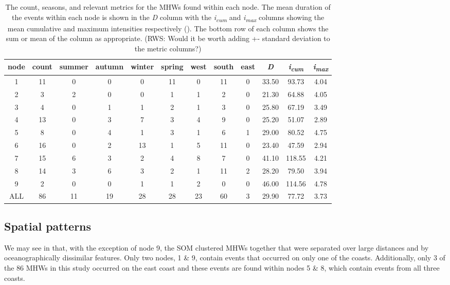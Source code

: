\documentclass[a4paper,10pt,review]{elsarticle}
\begin{document}
\begin{table}[ht]
\caption{\small The count, seasons, and relevant metrics for the MHWs found within each node. The mean duration of the events within each node is shown in the \emph{D} column with the \emph{i\textsubscript{cum}} and \emph{i\textsubscript{max}} columns showing the mean cumulative and maximum intensities respectively (). The bottom row of each column shows the sum or mean of the column as appropriate. (RWS: Would it be worth adding +- standard deviation to the metric columns?)}
\label{table2}
\centering
\tiny
\begin{tabular}{cccccccccccc}
  \toprule
node & count & summer & autumn & winter & spring & west & south & east & \emph{D} & \emph{i\textsubscript{cum}} & \emph{i\textsubscript{max}} \\ 
  \midrule
  1 &  11 &   0 &   0 &   0 &  11 &   0 &  11 &   0 & 33.50 & 93.73 & 4.04 \\ 
  2 &   3 &   2 &   0 &   0 &   1 &   1 &   2 &   0 & 21.30 & 64.88 & 4.05 \\ 
  3 &   4 &   0 &   1 &   1 &   2 &   1 &   3 &   0 & 25.80 & 67.19 & 3.49 \\ 
  4 &  13 &   0 &   3 &   7 &   3 &   4 &   9 &   0 & 25.20 & 51.07 & 2.89 \\ 
  5 &   8 &   0 &   4 &   1 &   3 &   1 &   6 &   1 & 29.00 & 80.52 & 4.75 \\ 
  6 &  16 &   0 &   2 &  13 &   1 &   5 &  11 &   0 & 23.40 & 47.59 & 2.94 \\ 
  7 &  15 &   6 &   3 &   2 &   4 &   8 &   7 &   0 & 41.10 & 118.55 & 4.21 \\ 
  8 &  14 &   3 &   6 &   3 &   2 &   1 &  11 &   2 & 28.20 & 79.50 & 3.94 \\ 
  9 &   2 &   0 &   0 &   1 &   1 &   2 &   0 &   0 & 46.00 & 114.56 & 4.78 \\ 
  ALL &  86 &  11 &  19 &  28 &  28 &  23 &  60 &   3 & 29.90 & 77.72 & 3.73 \\  
  \bottomrule
  \end{tabular}
\end{table}

\subsection{Spatial patterns}
We may see in  that, with the exception of node 9, the SOM clustered MHWs together that were separated over large distances and by oceanographically dissimilar features. Only two nodes, 1 \& 9, contain events that occurred on only one of the coasts. Additionally, only 3 of the 86 MHWs in this study occurred on the east coast and these events are found within nodes 5 \& 8, which contain events from all three coasts.
\end{document}
